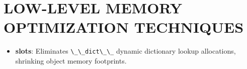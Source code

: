 \hypertarget{low-level-memory-optimization-techniques}{%
\chapter{LOW-LEVEL MEMORY OPTIMIZATION
TECHNIQUES}\label{low-level-memory-optimization-techniques}}

\begin{itemize}
\tightlist
\item
  \textbf{\textbf{slots}}: Eliminates
  \passthrough{\lstinline!\_\_dict\_\_!} dynamic dictionary lookup
  allocations, shrinking object memory footprints.
\end{itemize}

